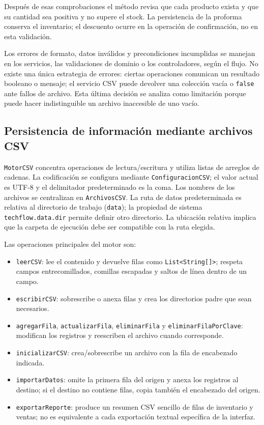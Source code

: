 Después de esas comprobaciones el método revisa que cada producto exista y que su cantidad sea positiva y no supere el stock. La persistencia de la proforma conserva el inventario; el descuento ocurre en la operación de confirmación, no en esta validación.

Los errores de formato, datos inválidos y precondiciones incumplidas se manejan en los servicios, las validaciones de dominio o los controladores, según el flujo. No existe una única estrategia de errores: ciertas operaciones comunican un resultado booleano o mensaje; el servicio CSV puede devolver una colección vacía o \texttt{false} ante fallos de archivo. Esta última decisión se analiza como limitación porque puede hacer indistinguible un archivo inaccesible de uno vacío.

\subsection{Persistencia de información mediante archivos CSV}
\label{subsec:persistencia}

\texttt{MotorCSV} concentra operaciones de lectura/escritura y utiliza listas de arreglos de cadenas. La codificación se configura mediante \texttt{ConfiguracionCSV}; el valor actual es UTF-8 y el delimitador predeterminado es la coma. Los nombres de los archivos se centralizan en \texttt{ArchivosCSV}. La ruta de datos predeterminada es relativa al directorio de trabajo (\texttt{data}); la propiedad de sistema \texttt{techflow.data.dir} permite definir otro directorio. La ubicación relativa implica que la carpeta de ejecución debe ser compatible con la ruta elegida.

Las operaciones principales del motor son:
\begin{itemize}
    \item \texttt{leerCSV}: lee el contenido y devuelve filas como \texttt{List<String[]>}; respeta campos entrecomillados, comillas escapadas y saltos de línea dentro de un campo.
    \item \texttt{escribirCSV}: sobrescribe o anexa filas y crea los directorios padre que sean necesarios.
    \item \texttt{agregarFila}, \texttt{actualizarFila}, \texttt{eliminarFila} y \texttt{eliminarFilaPorClave}: modifican los registros y reescriben el archivo cuando corresponde.
    \item \texttt{inicializarCSV}: crea/sobrescribe un archivo con la fila de encabezado indicada.
    \item \texttt{importarDatos}: omite la primera fila del origen y anexa los registros al destino; si el destino no contiene filas, copia también el encabezado del origen.
    \item \texttt{exportarReporte}: produce un resumen CSV sencillo de filas de inventario y ventas; no es equivalente a cada exportación textual específica de la interfaz.
\end{itemize}


